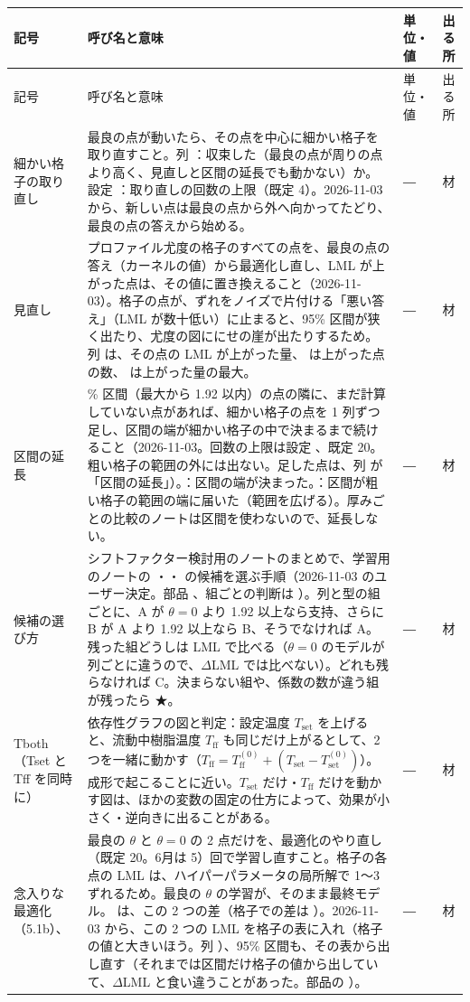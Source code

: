 \documentclass[paper=a4paper,fontsize=10.5pt,line_length=44zw,number_of_lines=38]{jlreq}
\makeatletter
\newcommand{\file}[1]{\texttt{\detokenize{#1}}}
\newcommand{\Tff}{T_{\mathrm{ff}}}
\newcommand{\Tset}{T_{\mathrm{set}}}
\newenvironment{symtab}{%
  \begin{longtable}{@{}>{\raggedright\arraybackslash}p{6.5\zw}>{\raggedright\arraybackslash}p{22\zw}>{\raggedright\arraybackslash}p{6\zw}>{\raggedright\arraybackslash}p{4.5\zw}@{}}
  \toprule 記号 & 呼び名と意味 & 単位・値 & 出る所 \\ \midrule \endfirsthead
  \toprule 記号 & 呼び名と意味 & 単位・値 & 出る所 \\ \midrule \endhead
  \bottomrule \endlastfoot}{\end{longtable}}
\makeatother
\begin{document}
\begin{symtab}
細かい格子の取り直し & 最良の点が動いたら、その点を中心に細かい格子を取り直すこと。列 \file{refine_converged}：収束した（最良の点が周りの点より高く、見直しと区間の延長でも動かない）か。設定 \file{MAX_REFINE}：取り直しの回数の上限（既定 4）。2026-11-03 から、新しい点は最良の点から外へ向かってたどり、最良の点の答えから始める。 & ― & 材 \\
見直し & プロファイル尤度の格子のすべての点を、最良の点の答え（カーネルの値）から最適化し直し、LML が上がった点は、その値に置き換えること（2026-11-03）。格子の点が、ずれをノイズで片付ける「悪い答え」（LML が数十低い）に止まると、95\% 区間が狭く出たり、尤度の図ににせの崖が出たりするため。列 \file{review_gain} は、その点の LML が上がった量、\file{n_review_up} は上がった点の数、\file{review_gain_max} は上がった量の最大。 & ― & 材 \\
区間の延長 & 95\% 区間（最大から 1.92 以内）の点の隣に、まだ計算していない点があれば、細かい格子の点を 1 列ずつ足し、区間の端が細かい格子の中で決まるまで続けること（2026-11-03。回数の上限は設定 \file{MAX_EXTEND}、既定 20。粗い格子の範囲の外には出ない。足した点は、列 \file{stage} が「区間の延長」）。\file{interval_closed}：区間の端が決まった。\file{interval_at_range}：区間が粗い格子の範囲の端に届いた（範囲を広げる）。厚みごとの比較のノートは区間を使わないので、延長しない。 & ― & 材 \\
候補の選び方 & シフトファクター検討用のノートのまとめで、学習用のノートの \file{SHIFT_COL}・\file{SHIFT_STRUCT}・\file{SHIFT_FORM} の候補を選ぶ手順（2026-11-03 のユーザー決定。部品 \file{shift_candidates}、組ごとの判断は \file{候補の選び方.csv}）。列と型の組ごとに、A が $\theta=0$ より 1.92 以上なら支持、さらに B が A より 1.92 以上なら B、そうでなければ A。残った組どうしは LML で比べる（$\theta=0$ のモデルが列ごとに違うので、$\Delta$LML では比べない）。どれも残らなければ C。決まらない組や、係数の数が違う組が残ったら ★。 & ― & 材 \\
Tboth（Tset と Tff を同時に） & 依存性グラフの図と判定：設定温度 $\Tset$ を上げると、流動中樹脂温度 $\Tff$ も同じだけ上がるとして、2 つを一緒に動かす（$\Tff=\Tff^{(0)}+(\Tset-\Tset^{(0)})$）。成形で起こることに近い。$\Tset$ だけ・$\Tff$ だけを動かす図は、ほかの変数の固定の仕方によって、効果が小さく・逆向きに出ることがある。 & ― & 材 \\
念入りな最適化（5.1b）、\file{N_RESTARTS} & 最良の $\theta$ と $\theta=0$ の 2 点だけを、最適化のやり直し \file{N_RESTARTS}（既定 20。6月は 5）回で学習し直すこと。格子の各点の LML は、ハイパーパラメータの局所解で 1〜3 ずれるため。最良の $\theta$ の学習が、そのまま最終モデル。\file{dLML_vs_0} は、この 2 つの差（格子での差は \file{dLML_vs_0_grid}）。2026-11-03 から、この 2 つの LML を格子の表に入れ（格子の値と大きいほう。列 \file{careful}）、95\% 区間も、その表から出し直す（それまでは区間だけ格子の値から出していて、$\Delta$LML と食い違うことがあった。部品の \file{profile_careful}）。 & ― & 材 \\

\end{symtab}
\end{document}
